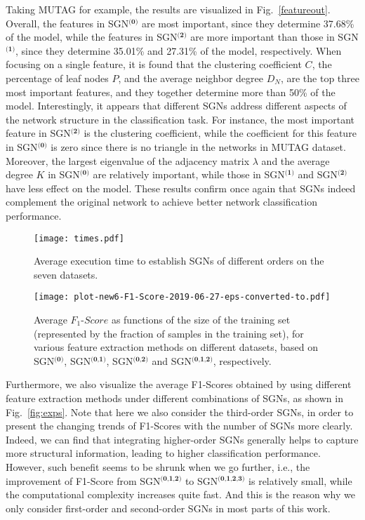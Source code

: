 \documentclass[10pt,journal,compsoc]{IEEEtran}
\begin{document}
Taking MUTAG for example, the results are visualized in Fig.~\ref{featureout}. Overall, the features in SGN$^{\textbf{(0)}}$ are most important, since they determine 37.68\% of the model, while the features in SGN$^{\textbf{(2)}}$ are more important than those in SGN$^{\textbf{(1)}}$, since they determine 35.01\% and 27.31\% of the model, respectively. When focusing on a single feature, it is found that the clustering coefficient $C$, the percentage of leaf nodes $P$, and the average neighbor degree $D_N$, are the top three most important features, and they together determine more than 50\% of the model. Interestingly, it appears that different SGNs address different aspects of the network structure in the classification task. For instance, the most important feature in SGN$^{\textbf{(2)}}$ is the clustering coefficient, while the coefficient for this feature in SGN$^{\textbf{(0)}}$ is zero since there is no triangle in the networks in MUTAG dataset. Moreover, the largest eigenvalue of the adjacency matrix $\lambda$ and the average degree $K$ in SGN$^{\textbf{(0)}}$ are relatively important, while those in SGN$^{\textbf{(1)}}$ and SGN$^{\textbf{(2)}}$ have less effect on the model. These results confirm once again that SGNs indeed complement the original network to achieve better network classification performance.

\begin{figure}[!t]
  \centering
  \texttt{[image: times.pdf]}
  \caption{Average execution time to establish SGNs of different orders on the seven datasets.}
  \label{fig:time}
\end{figure}

\begin{figure*}[!t]
	\centering
	\texttt{[image: plot-new6-F1-Score-2019-06-27-eps-converted-to.pdf]}
	\caption{Average $F_1$-$Score$ as functions of the size of the training set (represented by the fraction of samples in the training set), for various feature extraction methods on different datasets, based on SGN$^{\textbf{(0)}}$, SGN$^{\textbf{(0,1)}}$, SGN$^{\textbf{(0,2)}}$ and SGN$^{\textbf{(0,1,2)}}$, respectively.}
	\label{fig:precision}
\end{figure*}

Furthermore, we also visualize the average F1-Scores obtained by using different feature extraction methods under different combinations of SGNs, as shown in Fig.~\ref{fig:exps}. Note that here we also consider the third-order SGNs, in order to present the changing trends of F1-Scores with the number of SGNs more clearly. Indeed, we can find that integrating higher-order SGNs generally helps to capture more structural information, leading to higher classification performance. However, such benefit seems to be shrunk when we go further, i.e., the improvement of F1-Score from SGN$^{\textbf{(0,1,2)}}$ to SGN$^{\textbf{(0,1,2,3)}}$ is relatively small, while the computational complexity increases quite fast. And this is the reason why we only consider first-order and second-order SGNs in most parts of this work.
\end{document}
